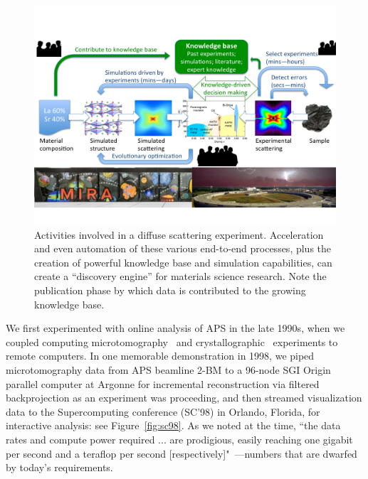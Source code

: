 \documentclass{aip-cp}
\begin{document}
\begin{figure}[h]
  \centerline{\includegraphics[width=6in,trim=0 2.6in 0 1.5in,clip]{Figs/diffuse.png}}
  \caption{Activities involved in a diffuse scattering experiment. 
  Acceleration and even automation of these various end-to-end processes, plus the creation of powerful knowledge base and simulation capabilities, can create a ``discovery engine'' for materials science research. 
  Note the publication phase by which data is contributed to the growing knowledge base.\label{fig:diffuse}}
\end{figure}


We first experimented with online analysis of APS in the late 1990s, 
when we coupled 
computing microtomography~\cite{wang1999quasi,wang2001high} and crystallographic~\cite{von2000using}
experiments to remote computers.
In one memorable demonstration in 1998, we piped microtomography data from APS beamline 2-BM to a 96-node SGI Origin parallel computer 
at Argonne for incremental reconstruction via filtered backprojection as an experiment was proceeding,
and then streamed visualization data to the Supercomputing conference (SC'98) in Orlando, Florida, 
for interactive analysis: see Figure~\ref{fig:sc98}. 
As we noted at the time, 
``the data rates and compute power required ... are prodigious, easily reaching one gigabit per second and a teraflop per second [respectively]"~\cite{von2000real}---numbers that are dwarfed by today's requirements. 
\end{document}
